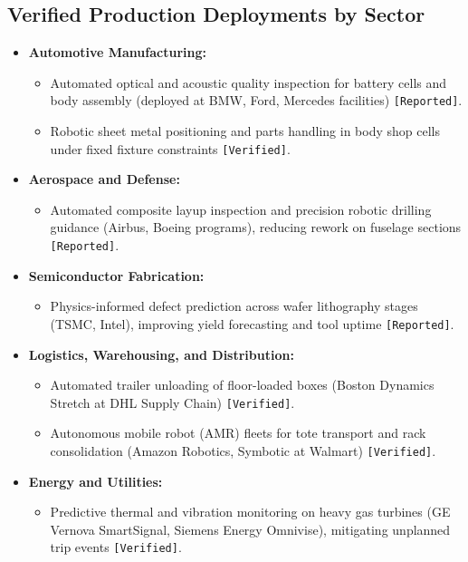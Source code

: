 \documentclass[11pt,a4paper]{article}
\begin{document}
\subsection{Verified Production Deployments by Sector}
\begin{itemize}
    \item \textbf{Automotive Manufacturing:}
    \begin{itemize}
        \item Automated optical and acoustic quality inspection for battery cells and body assembly (deployed at BMW, Ford, Mercedes facilities) \texttt{[Reported]}.
        \item Robotic sheet metal positioning and parts handling in body shop cells under fixed fixture constraints \texttt{[Verified]}.
    \end{itemize}
    \item \textbf{Aerospace and Defense:}
    \begin{itemize}
        \item Automated composite layup inspection and precision robotic drilling guidance (Airbus, Boeing programs), reducing rework on fuselage sections \texttt{[Reported]}.
    \end{itemize}
    \item \textbf{Semiconductor Fabrication:}
    \begin{itemize}
        \item Physics-informed defect prediction across wafer lithography stages (TSMC, Intel), improving yield forecasting and tool uptime \texttt{[Reported]}.
    \end{itemize}
    \item \textbf{Logistics, Warehousing, and Distribution:}
    \begin{itemize}
        \item Automated trailer unloading of floor-loaded boxes (Boston Dynamics Stretch at DHL Supply Chain) \texttt{[Verified]}.
        \item Autonomous mobile robot (AMR) fleets for tote transport and rack consolidation (Amazon Robotics, Symbotic at Walmart) \texttt{[Verified]}.
    \end{itemize}
    \item \textbf{Energy and Utilities:}
    \begin{itemize}
        \item Predictive thermal and vibration monitoring on heavy gas turbines (GE Vernova SmartSignal, Siemens Energy Omnivise), mitigating unplanned trip events \texttt{[Verified]}.
    \end{itemize}
\end{itemize}
\end{document}
